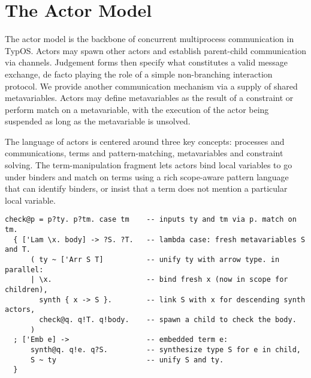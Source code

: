 \documentclass{easychair}
\newcommand{\TypOS}{TypOS\xspace}
\newcommand{\tm}[1]{\texttt{#1}\;}
\newcommand{\x}{\tm{x}}
\begin{document}

\section*{The Actor Model}

The actor model is the backbone of concurrent multiprocess communication in \TypOS. %
Actors may spawn other actors and establish parent-child communication via channels.
Judgement forms then specify what constitutes a valid message exchange, de facto 
playing the role of a simple non-branching interaction protocol. We provide
another communication mechanism via a supply of shared metavariables. Actors may 
define metavariables as the result of a constraint or perform match on a metavariable,
with the execution of the actor being suspended as long as the metavariable is unsolved. 




The language of actors is centered around three key concepts:
processes and communications,
terms and pattern-matching,
metavariables and constraint solving.
%
The term-manipulation fragment lets actors bind local variables to go
under binders and match on terms using a rich scope-aware pattern language
that can identify binders, or insist that a term does not mention a particular
local variable.
%
%

\begin{lstlisting}[columns=fullflexible,keepspaces=true]
check@p = p?ty. p?tm. case tm    -- inputs ty and tm via p. match on tm.
  { ['Lam \x. body] -> ?S. ?T.   -- lambda case: fresh metavariables S and T.
      ( ty ~ ['Arr S T]          -- unify ty with arrow type. in parallel:
      | \x.                      -- bind fresh x (now in scope for children),
        synth { x -> S }.        -- link S with x for descending synth actors,
        check@q. q!T. q!body.    -- spawn a child to check the body.
      )
  ; ['Emb e] ->                  -- embedded term e:
      synth@q. q!e. q?S.         -- synthesize type S for e in child,
      S ~ ty                     -- unify S and ty.
  }
\end{lstlisting}
\end{document}
